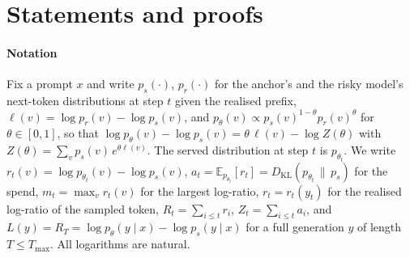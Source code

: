 \appendices
\section{Statements and proofs}\label{app:theory}

\paragraph{Notation}
Fix a prompt $x$ and write $p_s(\cdot)$, $p_r(\cdot)$ for the anchor's and the risky model's next-token distributions at step $t$ given the realised prefix, $\ell(v) = \log p_r(v) - \log p_s(v)$, and $p_\theta(v) \propto p_s(v)^{1-\theta} p_r(v)^{\theta}$ for $\theta \in [0,1]$, so that $\log p_\theta(v) - \log p_s(v) = \theta\,\ell(v) - \log Z(\theta)$ with $Z(\theta) = \sum_v p_s(v)\, e^{\theta \ell(v)}$. The served distribution at step $t$ is $p_{\theta_t}$. We write $r_t(v) = \log p_{\theta_t}(v) - \log p_s(v)$, $a_t = \mathbb{E}_{p_{\theta_t}}[r_t] = D_{\mathrm{KL}}(p_{\theta_t}\,\|\,p_s)$ for the spend, $m_t = \max_v r_t(v)$ for the largest log-ratio, $r_t = r_t(y_t)$ for the realised log-ratio of the sampled token, $R_t = \sum_{i \le t} r_i$, $Z_t = \sum_{i \le t} a_i$, and $L(y) = R_T = \log p_\theta(y \mid x) - \log p_s(y \mid x)$ for a full generation $y$ of length $T \le T_{\max}$. All logarithms are natural.

